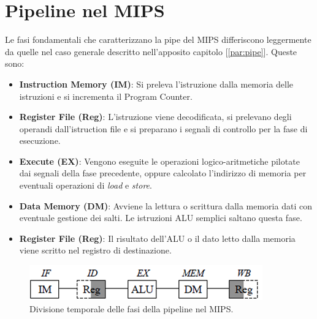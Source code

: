 \section{Pipeline nel MIPS}
Le fasi fondamentali che caratterizzano la pipe del MIPS differiscono leggermente da quelle nel caso generale descritto nell'apposito capitolo [\ref{par:pipe}]. Queste sono:
\begin{itemize}
    \item \textbf{Instruction Memory (IM)}: Si preleva l'istruzione dalla memoria delle istruzioni e si incrementa il Program Counter.
    \item \textbf{Register File (Reg)}: L'istruzione viene decodificata, si prelevano degli operandi dall'istruction file e si preparano i segnali di controllo per la fase di esecuzione.
    \item \textbf{Execute (EX)}: Vengono eseguite le operazioni logico-aritmetiche pilotate dai segnali della fase precedente, oppure calcolato l'indirizzo di memoria per eventuali operazioni di \textit{load} e \textit{store}.
    \item \textbf{Data Memory (DM)}: Avviene la lettura o scrittura dalla memoria dati con eventuale gestione dei salti. Le istruzioni ALU semplici saltano questa fase.
    \item \textbf{Register File (Reg)}: Il risultato dell’ALU o il dato letto dalla memoria viene scritto nel registro di destinazione.
\end{itemize}
\begin{figure}[!h]
    \centering
    \includegraphics[width=0.5\linewidth]{img/MIPS_clock_split.png}
    \caption{Divisione temporale delle fasi della pipeline nel MIPS.}
    \label{fig:mips-pipe}
\end{figure}


